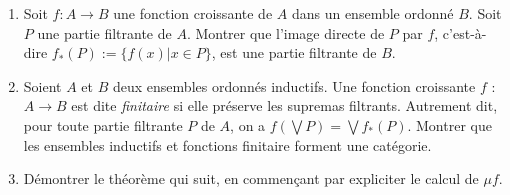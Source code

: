 \documentclass[12pt]{article}
\begin{document}
\begin{enumerate}
        \begin{enumerate}
            \item Les parties $\mathcal{P}(X)$ d'un ensemble quelconque $X$
            \item L'ensemble \textbf{Rel}($X,X$) des endorelationsd'un ensemble $X$ ordonnés par l'inclusion.
            \item L'ensemble vide. 
            \item Un ensemble ordonné fini quelconque. 
            \item L'ensemble $\omega$ des entiers naturels muni de l'ordre usuel. 
            \item L'ensemble $\mathbb{Q}^\infty$ des rationnels étendu avec un éléments maximal $\infty$ muni de l'ordre usuel.
            \item Un ensemble totalement ordonné quelconque.
            \item L'ensemble $\mathbb{N}_{\bot}$ := $\mathbb{N} +  \{\bot\}$ muni de la relation d'ordre  telle que $\bot$ soit minimal et les entiers incomparables  deux à deux.
            \item L'ensemble $X^\infty = X^*  \cup X ^{\omega}$ des séquences de longueur au plus  dénombrable d'éléments de $X$, muni de la relation d'ordre préfixe définie par  
                \[
                    xs \leq yz \iff  \exists zs \in X^\infty , xs \cdot zs = ys
                \]
                où  $xs \cdot zs$ désigne la concaténation de $xs$ et $zs$, qui est par définition égale à $xs$ si $xs$ est une séquence  de longueur infinie.
        \end{enumerate}
    \item Soit $f : A \rightarrow B $ une fonction  croissante de $A$  dans un ensemble ordonné $B$. Soit $P$  une partie filtrante  de $A$. Montrer que l'image  directe de $P$  par $f$, c'est-à-dire $f_*(P) := \{f(x)| x \in P\}$, est une partie filtrante  de $B$.
    \item Soient $A$ et $B$ deux ensembles  ordonnés inductifs. Une fonction croissante  $f$ : $A \rightarrow B$ est dite \textit{finitaire} si elle préserve  les supremas filtrants. Autrement dit, pour toute partie filtrante  $P$ de $A$, on a $f (\bigvee P) = \bigvee f_*(P)$. Montrer que les ensembles inductifs  et fonctions finitaire forment une catégorie.
    \item Démontrer le théorème qui suit, en commençant par expliciter  le calcul de $\mu f$.\\




\end{enumerate}
\end{document}
